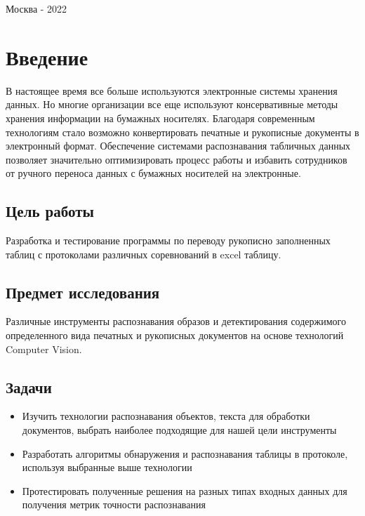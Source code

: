 \documentclass[a4paper, 12pt]{report}
\begin{document}
\bigskip
\bigskip
\bigskip
\bigskip
\bigskip
\bigskip
\bigskip

    
\begin{center}
    Москва - 2022
\end{center}
\pagebreak

\tableofcontents

\chapter{Введение}
В настоящее время все больше используются электронные системы хранения данных. Но многие организации все еще используют консервативные методы хранения информации на бумажных носителях. Благодаря современным технологиям стало возможно конвертировать печатные и рукописные документы в электронный формат. Обеспечение системами распознавания табличных данных позволяет значительно оптимизировать процесс работы и избавить сотрудников от ручного переноса данных с бумажных носителей на электронные.

\section{Цель работы}
Разработка и тестирование программы по переводу рукописно заполненных таблиц с протоколами различных соревнований в excel таблицу.

\section{Предмет исследования}
Различные инструменты распознавания образов и детектирования содержимого определенного вида печатных и рукописных документов на основе технологий Computer Vision.

\section{Задачи}
\begin{itemize}
  \item Изучить технологии распознавания объектов, текста для обработки документов, выбрать наиболее подходящие для нашей цели инструменты
  \item Разработать алгоритмы обнаружения и распознавания таблицы в протоколе, используя выбранные выше технологии
  \item Протестировать полученные решения на разных типах входных данных для получения метрик точности распознавания
\end{itemize}
\end{document}
